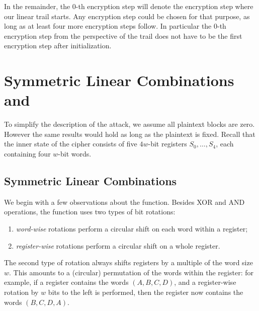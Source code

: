 \documentclass{llncs}
\begin{document}
In the remainder, the $0$-th encryption step will denote the encryption step where our linear trail starts. Any encryption step could be chosen for that purpose, as long as at least four more encryption steps follow. In particular the $0$-th encryption step from the perspective of the trail does not have to be the first encryption step after initialization.

%

\section{Symmetric Linear Combinations and }
\label{sec:introminimorus}

To simplify the description of the attack, we assume all plaintext blocks are zero. However the same results would hold as long as the plaintext is fixed. Recall that the inner state of the cipher consists of five $4w$-bit registers $S_0,\dots,S_4$, each containing four $w$-bit words.

\subsection{Symmetric Linear Combinations}

We begin with a few observations about the \StateUpdate{} function. Besides XOR and AND operations, the \StateUpdate{} function uses two types of bit rotations:
\begin{enumerate}
\item \emph{word-wise} rotations perform a circular shift on each word within a register;
\item \emph{register-wise} rotations perform a circular shift on a whole register.
\end{enumerate}
The second type of rotation always shifts registers by a multiple of the word size $w$. This amounts to a (circular) permutation of the words within the register: for example, if a register contains the words $(A, B, C, D)$, and a register-wise rotation by $w$ bits to the left is performed, then the register now contains the words $(B, C, D, A)$.
\end{document}
